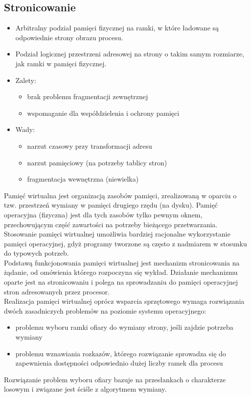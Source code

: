 \documentclass[12pt]{article}
\begin{document}
    \subsection{Stronicowanie}
    \begin{itemize}
        \item Arbitralny podział pamięci fizycznej na ramki, w które ładowane są odpowiednie strony obrazu procesu.
        \item Podział logicznej przestrzeni adresowej na strony o takim samym rozmiarze, jak ramki w pamięci fizycznej.
        \item Zalety:
        \begin{itemize}
            \item brak problemu fragmentacji zewnętrznej
            \item wspomaganie dla współdzielenia i ochrony pamięci
        \end{itemize}
        \item Wady:
        \begin{itemize}
            \item narzut czasowy przy transformacji adresu
            \item narzut pamięciowy (na potrzeby tablicy stron)
            \item fragmentacja wewnętrzna (niewielka)
        \end{itemize}
    \end{itemize}
    
    Pamięć wirtualna jest organizacją zasobów pamięci, zrealizowaną w oparciu o tzw. przestrzeń wymiany w pamięci drugiego rzędu (na dysku). Pamięć operacyjna (fizyczna) jest dla tych zasobów tylko pewnym oknem, przechowującym część zawartości na potrzeby bieżącego przetwarzania. Stosowanie pamięci wirtualnej umożliwia bardziej racjonalne wykorzystanie pamięci operacyjnej, gdyż programy tworzone są często z nadmiarem w stosunku do typowych potrzeb.
    \\
    Podstawą funkcjonowania pamięci wirtualnej jest mechanizm stronicowania na żądanie, od omówienia którego rozpoczyna się
    wykład. Działanie mechanizmu oparte jest na stronicowaniu i polega na sprowadzaniu do pamięci operacyjnej stron adresowanych przez procesor.
    \\
    Realizacja pamięci wirtualnej oprócz wsparcia sprzętowego
    wymaga rozwiązania dwóch zasadniczych problemów na poziomie systemu operacyjnego:
    \begin{itemize}
        \item problemu wyboru ramki ofiary do wymiany strony, jeśli zajdzie potrzeba wymiany
        \item problemu wznawiania rozkazów, którego rozwiązanie sprowadza się do zapewnienia dostępności odpowiednio dużej liczby ramek dla procesu
    \end{itemize}
    Rozwiązanie problem wyboru ofiary bazuje na przesłankach o charakterze losowym i związane jest ściśle z algorytmem wymiany.
    \\
\end{document}
